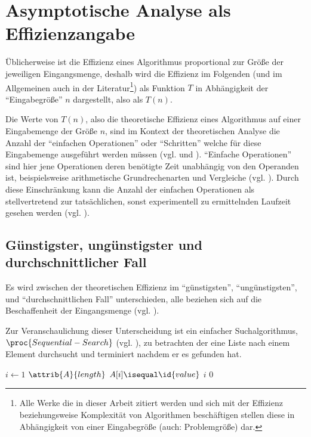 \chapter{Asymptotische Analyse als Effizienzangabe}
\label{cha:asymptotic-analysis}

Üblicherweise ist die Effizienz eines Algorithmus proportional zur Größe der jeweiligen Eingangsmenge, deshalb wird die Effizienz im Folgenden (und im Allgemeinen auch in der Literatur\footnote{Alle Werke die in dieser Arbeit zitiert werden und sich mit der Effizienz beziehungsweise Komplexität von Algorithmen beschäftigen stellen diese in Abhängigkeit von einer Eingabegröße (auch: Problemgröße) dar.}) als Funktion $T$ in Abhängigkeit der \enquote{Eingabegröße} $n$ dargestellt, also als $T(n)$.

Die Werte von $T(n)$, also die theoretische Effizienz eines Algorithmus auf einer Eingabemenge der Größe $n$, sind im Kontext der theoretischen Analyse die Anzahl der \enquote{einfachen Operationen} oder \enquote{Schritten} welche für diese Eingabemenge ausgeführt werden müssen (vgl. \cite[25]{clrs2001} und \cite[18f]{hsr1997}). \enquote{Einfache Operationen} sind hier jene Operationen deren benötigte Zeit unabhängig von den Operanden ist, beispielsweise arithmetische Grundrechenarten und Vergleiche (vgl. \cite[55]{sha2011}). Durch diese Einschränkung kann die Anzahl der einfachen Operationen als stellvertretend zur tatsächlichen, sonst experimentell zu ermittelnden Laufzeit gesehen werden (vgl. \cite[55]{sha2011}).

\section{Günstigster, ungünstigster und durchschnittlicher Fall}
\label{sec:asymptotic-cases}

Es wird zwi\-schen der theoretischen Effizienz im \enquote{günstigsten}, \enquote{ungünstigsten}, und \enquote{durchschnittlichen Fall} unterschieden, alle beziehen sich auf die Beschaffenheit der Eingangsmenge (vgl. \cite[28]{hsr1997}).

Zur Veranschaulichung dieser Unterscheidung ist ein einfacher Suchalgorithmus, $\proc{Sequential-Search}$ (vgl. \cite[396]{taocp3}), zu betrachten der eine Liste nach einem Element durchsucht und terminiert nachdem er es gefunden hat.

\begin{codebox}
    \li \For $i \gets 1$ \To $\attrib{A}{length}$
    \li     \Do
                \If $A[i] \isequal \id{value}$
    \li             \Then
                        \Return $i$
                    \End
            \End
    \li \Return $0$
\end{codebox}

